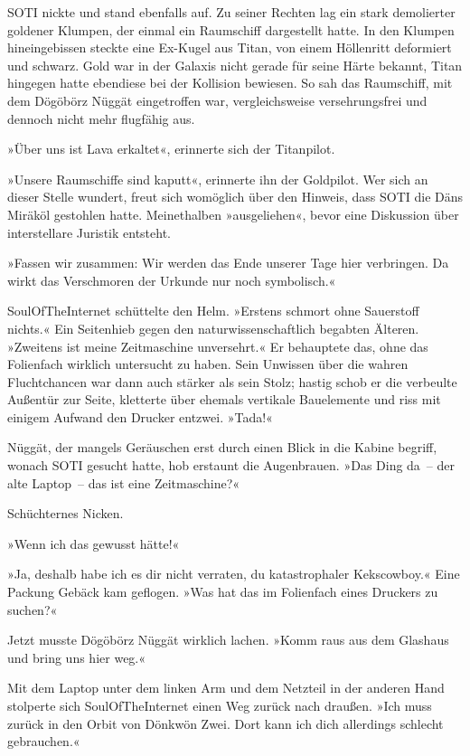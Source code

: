 SOTI nickte und stand ebenfalls auf. Zu seiner Rechten lag ein stark demolierter goldener Klumpen, der einmal ein Raumschiff dargestellt hatte. In den Klumpen hineingebissen steckte eine Ex-Kugel aus Titan, von einem Höllenritt deformiert und schwarz. Gold war in der Galaxis nicht gerade für seine Härte bekannt, Titan hingegen hatte ebendiese bei der Kollision bewiesen. So sah das Raumschiff, mit dem Dögöbörz Nüggät eingetroffen war, vergleichsweise versehrungsfrei und dennoch nicht mehr flugfähig aus.

»Über uns ist Lava erkaltet«, erinnerte sich der Titanpilot.

»Unsere Raumschiffe sind kaputt«, erinnerte ihn der Goldpilot. Wer sich an dieser Stelle wundert, freut sich womöglich über den Hinweis, dass SOTI die Däns Miräköl gestohlen hatte. Meinethalben »ausgeliehen«, bevor eine Diskussion über interstellare Juristik entsteht.

»Fassen wir zusammen: Wir werden das Ende unserer Tage hier verbringen. Da wirkt das Verschmoren der Urkunde nur noch symbolisch.«

SoulOfTheInternet schüttelte den Helm. »Erstens schmort ohne Sauerstoff nichts.« Ein Seitenhieb gegen den naturwissenschaftlich begabten Älteren. »Zweitens ist meine Zeitmaschine unversehrt.« Er behauptete das, ohne das Folienfach wirklich untersucht zu haben. Sein Unwissen über die wahren Fluchtchancen war dann auch stärker als sein Stolz; hastig schob er die verbeulte Außentür zur Seite, kletterte über ehemals vertikale Bauelemente und riss mit einigem Aufwand den Drucker entzwei. »Tada!«

Nüggät, der mangels Geräuschen erst durch einen Blick in die Kabine begriff, wonach SOTI gesucht hatte, hob erstaunt die Augenbrauen. »Das Ding da~– der alte Laptop~– das ist eine Zeitmaschine?«

Schüchternes Nicken.

»Wenn ich das gewusst hätte!«

»Ja, deshalb habe ich es dir nicht verraten, du katastrophaler Kekscowboy.« Eine Packung Gebäck kam geflogen. »Was hat das im Folienfach eines Druckers zu suchen?«

Jetzt musste Dögöbörz Nüggät wirklich lachen. »Komm raus aus dem Glashaus und bring uns hier weg.«

Mit dem Laptop unter dem linken Arm und dem Netzteil in der anderen Hand stolperte sich SoulOfTheInternet einen Weg zurück nach draußen. »Ich muss zurück in den Orbit von Dönkwön Zwei. Dort kann ich dich allerdings schlecht gebrauchen.«

